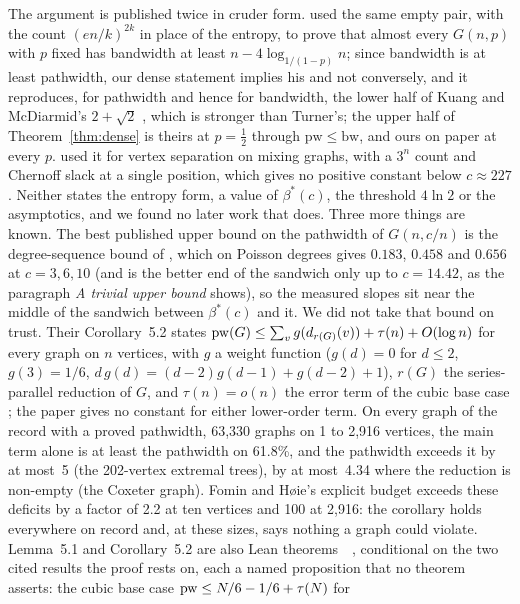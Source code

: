 The argument is published twice in cruder form. \citet{Turner1986} used the
same empty pair, with the count $(en/k)^{2k}$ in place of the entropy, to
prove that almost every $G(n,p)$ with $p$ fixed has bandwidth at least
$n-4\log_{1/(1-p)}n$; since bandwidth is at least pathwidth, our dense
statement implies his and not conversely, and it reproduces, for pathwidth
and hence for bandwidth, the lower half of Kuang and McDiarmid's
$2+\sqrt2$ \citep{KuangMcDiarmid1985,ErdosHellWinkler1989}, which is stronger
than Turner's; the upper half of Theorem~\ref{thm:dense} is theirs at $p=\tfrac12$
through $\mathrm{pw}\le\mathrm{bw}$, and ours on paper at every $p$. \citet{DiazPetitSernaTrevisan2001}
used it for vertex separation on mixing graphs, with a $3^{n}$ count and
Chernoff slack at a single position, which gives no positive constant below
$c\approx227$. Neither states the entropy form, a value of $\beta^{*}(c)$, the
threshold $4\ln2$ or the asymptotics, and we found no later work that does.
Three more things are known. The best published upper bound on the pathwidth
of $G(n,c/n)$ is the degree-sequence bound of \citet{EdwardsMcDermid2015},
which on Poisson degrees gives $0.183$, $0.458$ and $0.656$ at $c=3,6,10$
(and is the better end of the sandwich only up to $c=14.42$, as the paragraph
\emph{A trivial upper bound} shows),
so the measured slopes sit near the middle of the sandwich between
$\beta^{*}(c)$ and it. We did not take that bound on trust. Their Corollary~5.2 states
$\mathrm{pw}(G)\le\sum_{v}g(d_{r(G)}(v))+\tau(n)+O(\log n)$ for every graph on $n$
vertices, with $g$ a weight function ($g(d)=0$ for $d\le2$, $g(3)=1/6$,
$d\,g(d)=(d-2)g(d-1)+g(d-2)+1$), $r(G)$ the series-parallel reduction of
$G$, and $\tau(n)=o(n)$ the error term of the cubic base case
\citep[Theorem~5]{FominHoie2006}; the paper gives no constant for either
lower-order term. On every graph of the record with a proved pathwidth,
63,330 graphs on 1 to 2,916 vertices, the main term alone is at least the
pathwidth on 61.8\%, and the pathwidth exceeds it by at most~5 (the
202-vertex extremal trees), by at most~4.34 where the reduction is
non-empty (the Coxeter graph). Fomin and H{\o}ie's explicit budget exceeds
these deficits by a factor of 2.2 at ten vertices and 100 at 2,916: the
corollary holds everywhere on record and, at these sizes, says nothing a
graph could violate. Lemma~5.1 and Corollary~5.2 are also Lean
theorems~~, conditional
on the two cited results the proof rests on, each a named proposition that
no theorem asserts: the cubic base case $\mathrm{pw}\le N/6-1/6+\tau(N)$ for
